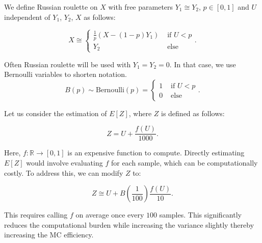 \documentclass[a4paper,12pt]{article}
\begin{document}
\begin{definition} \label{Russian roulette}
    We define Russian roulette on $X$ with free parameters
    $Y_{1} \cong Y_{2}$, $p \in [0,1]$
    and $U$ independent of $Y_{1}$, $Y_{2}$, $X$
    as follows:

    \begin{equation}
        X \cong
        \begin{cases}
            \frac{1}{p}(X - (1-p)Y_{1}) & \text{ if } U < p \\
            Y_{2}                       & \text{ else }
        \end{cases}.
    \end{equation}
\end{definition}


\begin{notation}[$B(p)$]
    Often Russian roulette will be used with $Y_{1}= Y_{2}= 0$.
    In that case, we use Bernoulli variables to shorten notation.
    \begin{equation}
        B(p) \sim \text{Bernoulli}(p) =
        \begin{cases}
            1 & \text{ if } U<p \\
            0 & \text{ else }
        \end{cases} .
    \end{equation}
\end{notation}

\begin{example} \label{ex:simple russian roulette}
    Let us consider the estimation of $E[Z]$, where $Z$ is defined as follows:

    \begin{equation}
        Z = U + \frac{f(U)}{1000}.
    \end{equation}

    Here, $f:\mathbb{R} \rightarrow [0,1]$ is an expensive function to compute.
    Directly estimating $E[Z]$ would involve evaluating $f$ for each sample,
    which can be computationally costly. To address this, we can modify $Z$ to:

    \begin{equation}
        Z \cong U + B\left(\frac{1}{100}\right)\frac{f(U)}{10}.
    \end{equation}

    This requires calling $f$ on
    average once every $100$ samples. This significantly reduces the
    computational burden while increasing the variance slightly thereby increasing
    the MC efficiency.\\
\end{example}
\end{document}
